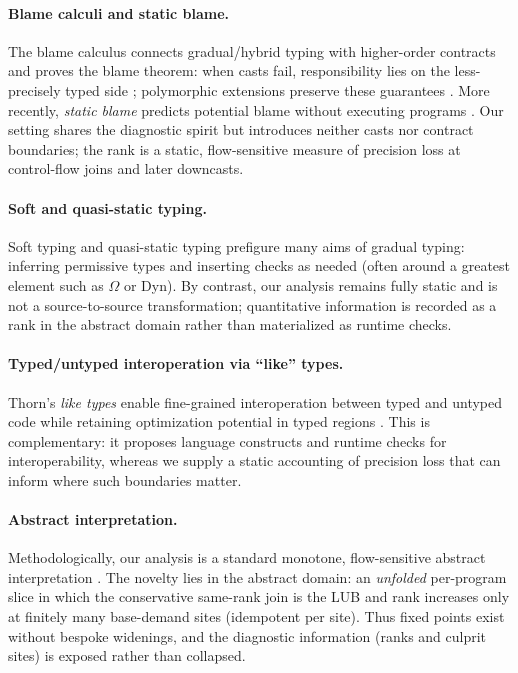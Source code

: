 \paragraph{Blame calculi and static blame.}
The blame calculus connects gradual/hybrid typing with higher-order contracts and proves the blame theorem: when casts fail, responsibility lies on the less-precisely typed side \cite{WadlerFindler2009}; polymorphic extensions preserve these guarantees \cite{AhmedFindlerSiekWadler2011}. More recently, \emph{static blame} predicts potential blame without executing programs \cite{SuCulpepper2024}. Our setting shares the diagnostic spirit but introduces neither casts nor contract boundaries; the rank is a static, flow-sensitive measure of precision loss at control-flow joins and later downcasts.

\paragraph{Soft and quasi-static typing.}
Soft typing \cite{CartwrightFagan1991} and quasi-static typing \cite{Thatte1990} prefigure many aims of gradual typing: inferring permissive types and inserting checks as needed (often around a greatest element such as $\Omega$ or \textsf{Dyn}). By contrast, our analysis remains fully static and is not a source-to-source transformation; quantitative information is recorded as a rank in the abstract domain rather than materialized as runtime checks.

\paragraph{Typed/untyped interoperation via ``like'' types.}
Thorn’s \emph{like types} enable fine-grained interoperation between typed and untyped code while retaining optimization potential in typed regions \cite{WrigstadEtAl2010}. This is complementary: it proposes language constructs and runtime checks for interoperability, whereas we supply a static accounting of precision loss that can inform where such boundaries matter.

\paragraph{Abstract interpretation.}
Methodologically, our analysis is a standard monotone, flow-sensitive abstract interpretation \cite{CousotCousot1977}. The novelty lies in the abstract domain: an \emph{unfolded} per-program slice in which the conservative same-rank join is the LUB and rank increases only at finitely many base-demand sites (idempotent per site). Thus fixed points exist without bespoke widenings, and the diagnostic information (ranks and culprit sites) is exposed rather than collapsed.
